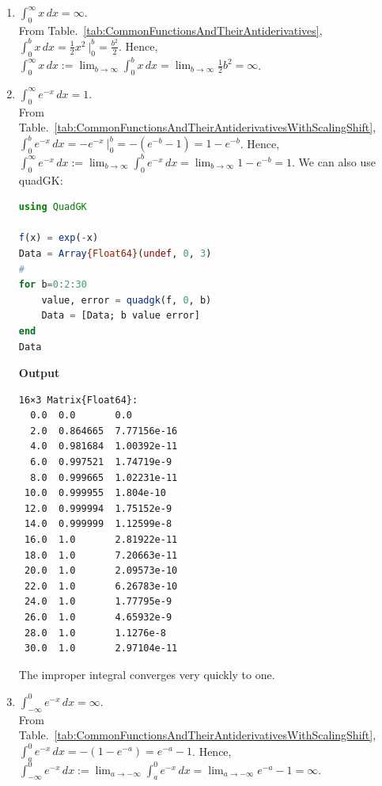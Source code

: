  \begin{enumerate}
\renewcommand{\labelenumi}{(\alph{enumi})}
\setlength{\itemsep}{.2cm}
    \item \Ans \quad $\int_0 ^\infty x \, dx = \infty$.\\

    From Table.~\ref{tab:CommonFunctionsAndTheirAntiderivatives}, $\int_0^b x \, dx = \frac{1}{2} x^2~ \bigg|_0^b =  \frac{b^2}{2}$. Hence,  $\int_0 ^\infty x \, dx :=\displaystyle \lim_{b \to \infty} \int_0^b x \, dx = \lim_{b \to \infty} \frac{1}{2} b^2 = \infty$.

    \item \Ans \quad $\int_0 ^\infty e^{-x} \, dx = 1$.\\

    From Table.~\ref{tab:CommonFunctionsAndTheirAntiderivativesWithScalingShift}, $\int_0 ^b e^{-x} \, dx = - e^{-x}~\bigg|_0^b =  -\left( e^{-b} - 1 \right) = 1 - e^{-b}$. Hence, $\int_0 ^\infty e^{-x} \, dx :=\displaystyle \lim_{b \to \infty} \int_0^b e^{-x} \, dx = \lim_{b \to \infty} 1 - e^{-b} = 1$. We can also use quadGK:

\begin{lstlisting}[language=Julia,style=mystyle]
using QuadGK

f(x) = exp(-x)
Data = Array{Float64}(undef, 0, 3)
#
for b=0:2:30
    value, error = quadgk(f, 0, b)
    Data = [Data; b value error]
end
Data
\end{lstlisting}
\textbf{Output} 
\begin{verbatim}
16×3 Matrix{Float64}:
  0.0  0.0       0.0
  2.0  0.864665  7.77156e-16
  4.0  0.981684  1.00392e-11
  6.0  0.997521  1.74719e-9
  8.0  0.999665  1.02231e-11
 10.0  0.999955  1.804e-10
 12.0  0.999994  1.75152e-9
 14.0  0.999999  1.12599e-8
 16.0  1.0       2.81922e-11
 18.0  1.0       7.20663e-11
 20.0  1.0       2.09573e-10
 22.0  1.0       6.26783e-10
 24.0  1.0       1.77795e-9
 26.0  1.0       4.65932e-9
 28.0  1.0       1.1276e-8
 30.0  1.0       2.97104e-11
\end{verbatim}
The improper integral converges very quickly to one. 

  \item \Ans \quad $\int_{-\infty}^0 e^{-x} \, dx = \infty$.\\

    From Table.~\ref{tab:CommonFunctionsAndTheirAntiderivativesWithScalingShift}, $\int_{a}^0 e^{-x} \, dx = - \left( 1 - e^{-a} \right) = e^{-a} -1$. Hence, $\int_{-\infty}^0 e^{-x} \, dx :=\displaystyle \lim_{a \to -\infty} \int_a^0 e^{-x} \, dx = \lim_{a \to -\infty} e^{-a} -1 = \infty$.
    


\end{enumerate}
